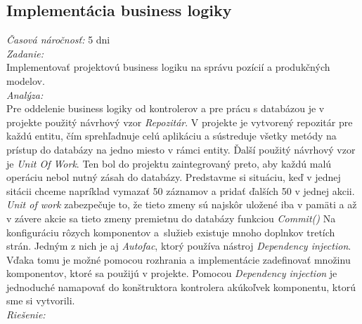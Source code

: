 \documentclass[11pt, oneside]{report}
\begin{document}
\subsection{Implementácia business logiky}
\textit{Časová náročnosť:} 5 dni\\
\textit{Zadanie:}\\
Implementovať projektovú business logiku na správu pozícií a produkčných modelov.
\\\textit{Analýza:}\\
Pre oddelenie business logiky od kontrolerov a pre prácu s databázou je v projekte použitý návrhový vzor \textit{Repozitár}. V projekte je vytvorený repozitár pre každú entitu, čím  sprehľadnuje celú aplikáciu a sústreduje všetky metódy na prístup do databázy na jedno miesto v rámci entity. Ďalší  použitý návrhový vzor je \textit{Unit Of Work}. Ten bol do projektu zaintegrovaný preto, aby každú malú operáciu nebol nutný zásah do databázy. Predstavme si situáciu, keď v jednej sitácii chceme  napríklad  vymazať 50 záznamov a pridať ďalších 50 v jednej akcii. \textit{Unit of work} zabezpečuje to, že tieto zmeny sú najskôr uložené  iba v pamäti a až v závere akcie sa tieto zmeny premietnu do databázy funkciou \textit{Commit()}
Na konfiguráciu  rôzych komponentov a~služieb existuje mnoho doplnkov tretích strán. Jedným z nich je aj \textit{Autofac}, ktorý používa  nástroj \textit{Dependency injection}. Vďaka tomu je možné pomocou rozhrania a  implementácie zadefinovať množinu komponentov, ktoré sa použijú v projekte. Pomocou \textit{Dependency injection} je jednoduché namapovať do konštruktora kontrolera akúkoľvek  komponentu, ktorú sme si vytvorili. 
\\\textit{Riešenie:}\\
\end{document}
